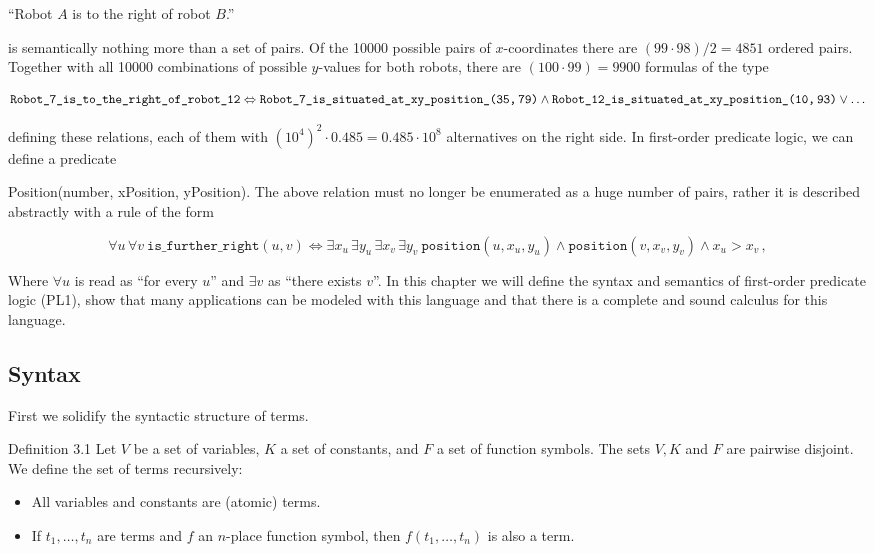 \documentclass[10pt]{book}
\begin{document}
\begin{displayquote}
``Robot $A$ is to the right of robot $B$.''
\end{displayquote}

is semantically nothing more than a set of pairs. Of the 10000 possible pairs of $x$-coordinates there are $(99 \cdot 98) / 2=4851$ ordered pairs. Together with all 10000 combinations of possible $y$-values for both robots, there are $(100 \cdot 99)=9900$ formulas of the type

\[
\texttt{Robot\_7\_is\_to\_the\_right\_of\_robot\_12} \Leftrightarrow
\texttt{Robot\_7\_is\_situated\_at\_xy\_position\_(35,\,79)} \wedge
\texttt{Robot\_12\_is\_situated\_at\_xy\_position\_(10,\,93)} \vee \ldots
\]

defining these relations, each of them with $\left(10^{4}\right)^{2} \cdot 0.485=0.485 \cdot 10^{8}$ alternatives on the right side. In first-order predicate logic, we can define a predicate

Position(number, xPosition, yPosition). The above relation must no longer be enumerated as a huge number of pairs, rather it is described abstractly with a rule of the form

\[
\forall u\,\forall v\ \texttt{is\_further\_right}(u,v) \Leftrightarrow
\exists x_{u}\,\exists y_{u}\,\exists x_{v}\,\exists y_{v}\ \texttt{position}(u,x_{u},y_{u}) \wedge \texttt{position}(v,x_{v},y_{v}) \wedge x_{u}>x_{v}\,,
\]

Where $\forall u$ is read as ``for every $u$'' and $\exists v$ as ``there exists $v$''.
In this chapter we will define the syntax and semantics of first-order predicate logic (PL1), show that many applications can be modeled with this language and that there is a complete and sound calculus for this language.

\subsection{Syntax}
First we solidify the syntactic structure of terms.

Definition 3.1 Let $V$ be a set of variables, $K$ a set of constants, and $F$ a set of function symbols. The sets $V, K$ and $F$ are pairwise disjoint. We define the set of terms recursively:

\begin{itemize}
  \item All variables and constants are (atomic) terms.
  \item If $t_{1}, \ldots, t_{n}$ are terms and $f$ an $n$-place function symbol, then $f\left(t_{1}, \ldots, t_{n}\right)$ is also a term.
\end{itemize}
\end{document}
